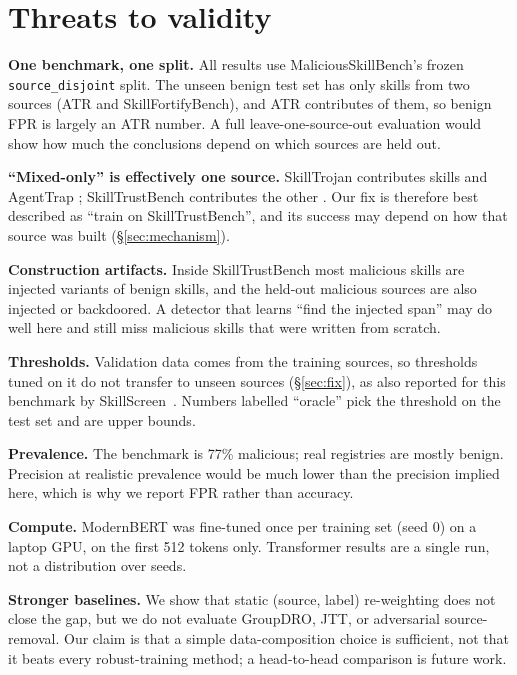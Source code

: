 \section{Threats to validity}
\label{sec:threats}
\textbf{One benchmark, one split.} All results use MaliciousSkillBench's frozen \texttt{source\_disjoint}
split. The unseen benign test set has only \TestBenign{} skills from two sources (ATR and SkillFortifyBench),
and ATR contributes \TestAtrBenign{} of them, so benign FPR is largely an ATR number. A full
leave-one-source-out evaluation would show how much the conclusions depend on which sources are held out.

\textbf{``Mixed-only'' is effectively one source.} SkillTrojan contributes \MixedSkillTrojan{} skills and
AgentTrap \MixedAgentTrap{}; SkillTrustBench contributes the other \MixedSkillTrustBench{}. Our fix is therefore
best described as ``train on SkillTrustBench'', and its success may depend on how that source was built
(\S\ref{sec:mechanism}).

\textbf{Construction artifacts.} Inside SkillTrustBench most malicious skills are injected variants of benign
skills, and the held-out malicious sources are also injected or backdoored. A detector that learns ``find the
injected span'' may do well here and still miss malicious skills that were written from scratch.

\textbf{Thresholds.} Validation data comes from the training sources, so thresholds tuned on it do not
transfer to unseen sources (\S\ref{sec:fix}), as also reported for this benchmark by
SkillScreen~\cite{skillscreen2026}. Numbers labelled ``oracle'' pick the threshold on the test set and are
upper bounds.

\textbf{Prevalence.} The benchmark is 77\% malicious; real registries are mostly benign. Precision at
realistic prevalence would be much lower than the precision implied here, which is why we report FPR rather
than accuracy.

\textbf{Compute.} ModernBERT was fine-tuned once per training set (seed 0) on a laptop GPU, on the first 512
tokens only. Transformer results are a single run, not a distribution over seeds.

\textbf{Stronger baselines.} We show that static (source, label) re-weighting does not close the gap,
but we do not evaluate GroupDRO, JTT, or adversarial source-removal. Our claim is that a simple
data-composition choice is sufficient, not that it beats every robust-training method; a head-to-head
comparison is future work.

